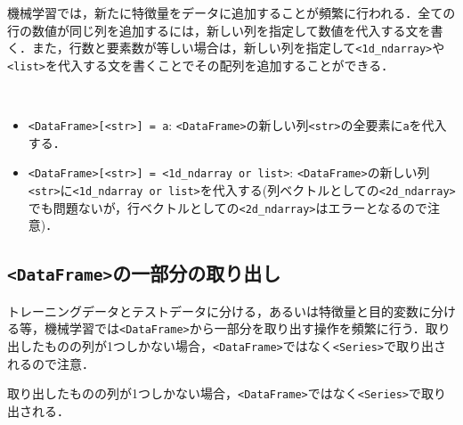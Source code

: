 機械学習では，新たに特徴量をデータに追加することが頻繁に行われる．全ての行の数値が同じ列を追加するには，新しい列を指定して数値を代入する文を書く．また，行数と要素数が等しい場合は，新しい列を指定して\texttt{<1d\_ndarray>}や\texttt{<list>}を代入する文を書くことでその配列を追加することができる．

\begin{gram}　
\begin{itemize}
\item \texttt{<DataFrame>[<str>] = a}: \texttt{<DataFrame>}の新しい列\texttt{<str>}の全要素に\texttt{a}を代入する．
\item \texttt{<DataFrame>[<str>] = <1d\_ndarray or list>}: \texttt{<DataFrame>}の新しい列\texttt{<str>}に\texttt{<1d\_ndarray or list>}を代入する(列ベクトルとしての\texttt{<2d\_ndarray>}でも問題ないが，行ベクトルとしての\texttt{<2d\_ndarray>}はエラーとなるので注意)．
\end{itemize}
\end{gram}
\begin{cod}[\texttt{pd3.py}]　
}]{code/pd3.py}
\vspace{-10pt}
\begin{lstlisting}
df=
   population   profit  all_1  ndarray  list
0      6.1101  17.5920      1        0     0
1      5.5277   9.1302      1        1     1
2      8.5186  13.6620      1        2     2
3      7.0032  11.8540      1        3     3
4      5.8598   6.8233      1        4     4
\end{lstlisting}
\end{cod}
\vspace{-10pt}

\subsection{\texttt{<DataFrame>}の一部分の取り出し}

トレーニングデータとテストデータに分ける，あるいは特徴量と目的変数に分ける等，機械学習では\texttt{<DataFrame>}から一部分を取り出す操作を頻繁に行う．取り出したものの列が1つしかない場合，\texttt{<DataFrame>}ではなく\texttt{<Series>}で取り出されるので注意．

\begin{rem}
取り出したものの列が1つしかない場合，\texttt{<DataFrame>}ではなく\texttt{<Series>}で取り出される．
\end{rem}

